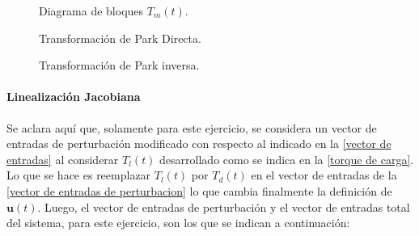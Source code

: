 \documentclass[a4paper, 10pt, onecolumn,journal]{ieeeconf}
\begin{document}
\begin{figure}[H]
    \centering
    \begin{adjustbox}{max width=\columnwidth}
    \end{adjustbox}
    \caption{Diagrama de bloques $T_m(t)$.}
    \label{diagrama de bloques T_m}
\end{figure}

\begin{figure}[H]
    \centering
    \begin{adjustbox}{max width=\columnwidth}
    \end{adjustbox}
    \caption{Transformación de Park Directa.}
    \label{transformacion de Park}
\end{figure}

\begin{figure}[H]
    \centering
    \begin{adjustbox}{max width=\columnwidth}
    \end{adjustbox}
    \caption{Transformación de Park inversa.}
    \label{transformacion de Park inversa}
\end{figure}

\paragraph{\textbf{Linealización Jacobiana}}
Se aclara aquí que, solamente para este ejercicio, se considera un vector de entradas de perturbación modificado
con respecto al indicado en la \cref{vector de entradas} al considerar $T_l(t)$ desarrollado como se indica en la \cref{torque de carga}.
Lo que se hace es reemplazar $T_l(t)$ por $T_d(t)$ en el vector de entradas de la \cref{vector de entradas de perturbacion} lo
que cambia finalmente la definición de $\mathbf{u}(t)$. Luego, el vector
de entradas de perturbación y el vector de entradas total del sistema, para este ejercicio, son los que se indican a continuación:
\end{document}
